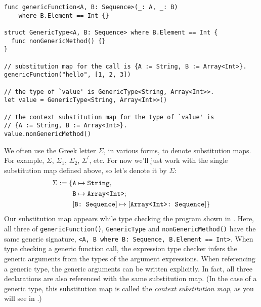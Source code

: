 \documentclass[../generics]{subfiles}
\begin{document}
\begin{listing}\label{substmaptypecheck}
\begin{Verbatim}
func genericFunction<A, B: Sequence>(_: A, _: B)
    where B.Element == Int {}

struct GenericType<A, B: Sequence> where B.Element == Int {
  func nonGenericMethod() {}
}

// substitution map for the call is {A := String, B := Array<Int>}.
genericFunction("hello", [1, 2, 3])

// the type of `value' is GenericType<String, Array<Int>>.
let value = GenericType<String, Array<Int>>()

// the context substitution map for the type of `value' is
// {A := String, B := Array<Int>}.
value.nonGenericMethod()
\end{Verbatim}
\end{listing}

\begin{example}
We often use the Greek letter $\Sigma$, in various forms, to denote substitution maps. For example, $\Sigma$, $\Sigma_1$, $\Sigma_2$, $\Sigma^\prime$, etc. For now we'll just work with the single substitution map defined above, so let's denote it by $\Sigma$:
\begin{align*}
\Sigma := \{
&\texttt{A} \mapsto \texttt{String},\\
&\texttt{B} \mapsto \texttt{Array<Int>}
;\,\\
&[\texttt{B:~Sequence}] \mapsto [\texttt{Array<Int>:~Sequence}]
\}
\end{align*}
Our substitution map appears while type checking the program shown in . Here, all three of \texttt{genericFunction()}, \texttt{GenericType} and \texttt{nonGenericMethod()} have the same generic signature, \texttt{<A, B where B:~Sequence, B.Element == Int>}. When type checking a generic function call, the expression type checker infers the generic arguments from the types of the argument expressions. When referencing a generic type, the generic arguments can be written explicitly. In fact, all three declarations are also referenced with the same substitution map. (In the case of a generic type, this substitution map is called the \emph{context substitution map}, as you will see in .)
\end{example}
\end{document}

